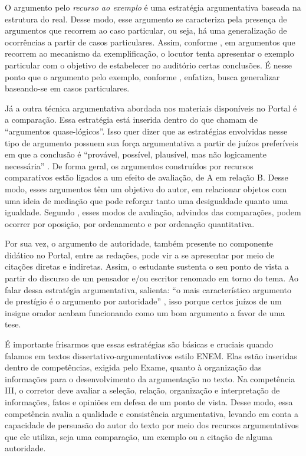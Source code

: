 \documentclass{textolivre}
\begin{document}
O argumento pelo \emph{recurso ao exemplo} é uma estratégia argumentativa baseada na estrutura do real. Desse modo, esse argumento se caracteriza pela presença de argumentos que recorrem ao caso particular, ou seja, há uma generalização de ocorrências a partir de casos particulares. Assim, conforme \textcite{perelman1996}, em argumentos que recorrem ao mecanismo da exemplificação, o locutor tenta apresentar o exemplo particular com o objetivo de estabelecer no auditório certas conclusões. É nesse ponto que o argumento pelo exemplo, conforme \textcite[p. 197]{garantizadojunior2015}, enfatiza, busca generalizar baseando-se em casos particulares.

Já a outra técnica argumentativa abordada nos materiais disponíveis no Portal é a comparação. Essa estratégia está inserida dentro do que \textcite{perelman1996} chamam de “argumentos quase-lógicos”. Isso quer dizer que as estratégias envolvidas nesse tipo de argumento possuem sua força argumentativa a partir de juízos preferíveis em que a conclusão é “provável, possível, plausível, mas não logicamente necessária” \cite[p. 115]{fiorin2018}. De forma geral, os argumentos construídos por recursos comparativos estão ligados a um efeito de avaliação, de A em relação B. Desse modo, esses argumentos têm um objetivo do autor, em relacionar objetos com uma ideia de mediação que pode reforçar tanto uma desigualdade quanto uma igualdade. Segundo \textcite[p. 291]{perelman1996}, esses modos de avaliação, advindos das comparações, podem ocorrer por oposição, por ordenamento e por ordenação quantitativa.

Por sua vez, o argumento de autoridade, também presente no componente didático no Portal, entre as redações, pode vir a se apresentar por meio de citações diretas e indiretas. Assim, o estudante sustenta o seu ponto de vista a partir do discurso de um pensador e/ou escritor renomado em torno do tema. Ao falar dessa estratégia argumentativa, \textcite{menezess2011} salienta: “o mais característico argumento de prestígio é o argumento por autoridade” \cite[p. 50]{menezess2011}, isso porque certos juízos de um insigne orador acabam funcionando como um bom argumento a favor de uma tese.

É importante frisarmos que essas estratégias são básicas e cruciais quando falamos em textos dissertativo-argumentativos estilo ENEM. Elas estão inseridas dentro de competências, exigida pelo Exame, quanto à organização das informações para o desenvolvimento da argumentação no texto. Na competência III, o corretor deve avaliar a seleção, relação, organização e interpretação de informações, fatos e opiniões em defesa de um ponto de vista. Desse modo, essa competência avalia a qualidade e consistência argumentativa, levando em conta a capacidade de persuasão do autor do texto por meio dos recursos argumentativos que ele utiliza, seja uma comparação, um exemplo ou a citação de alguma autoridade.
\end{document}

